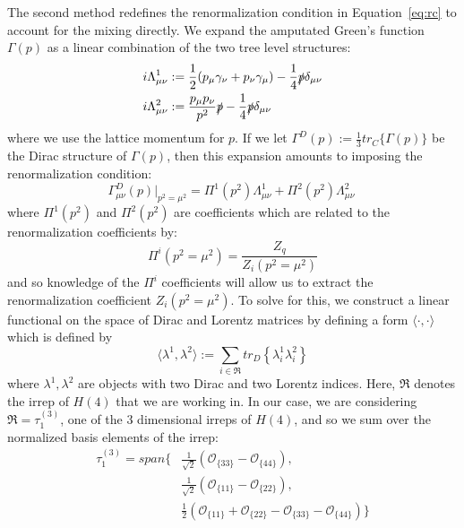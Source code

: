 \documentclass[11pt, oneside]{article}   	%
\theoremstyle{definition}
\begin{document}
The second method redefines the renormalization condition in Equation~\ref{eq:rc} to account for the mixing directly. We 
expand the amputated Green's function $\Gamma(p)$ as a linear combination of the two tree level structures:
\begin{align}
	i\Lambda_{\mu\nu}^{1} &:= \frac{1}{2}(p_\mu \gamma_\nu + p_\nu \gamma_\mu) - \frac{1}{4} \slashed p \delta_{\mu\nu} \\
	i\Lambda_{\mu\nu}^2 &:= \frac{p_\mu p_\nu}{p^2} \slashed p - \frac{1}{4} \slashed p \delta_{\mu\nu}
\end{align}
where we use the lattice momentum for $p$. If we let $\Gamma^D(p) := \frac{1}{3} tr_C\{\Gamma(p)\}$ be the Dirac structure of 
$\Gamma(p)$, then this expansion amounts to imposing the renormalization condition:
\begin{equation}
	\Gamma_{\mu\nu}^D(p)\bigg|_{p^2 = \mu^2} = \Pi^1(p^2) \Lambda^1_{\mu\nu} + \Pi^2(p^2) \Lambda^2_{\mu\nu}~
	\label{eq:mix_rc}
\end{equation}
where $\Pi^1(p^2)$ and $\Pi^2(p^2)$ are coefficients which are related to the renormalization coefficients by:
\begin{equation}
	\Pi^i(p^2 = \mu^2) = \frac{Z_q}{Z_i(p^2 = \mu^2)}
\end{equation}
and so knowledge of the $\Pi^i$ coefficients will allow us to extract the renormalization coefficient $Z_i(p^2 = \mu^2)$. To solve for 
this, we construct a linear functional on the space of Dirac and Lorentz matrices by defining a form $\langle\cdot, \cdot\rangle$ 
which is defined by
\begin{equation}
	\langle \lambda^1, \lambda^2\rangle := \sum_{i\in\mathfrak R} tr_D\left\{\lambda^1_i \lambda^2_i\right\}
\end{equation}
where $\lambda^1, \lambda^2$ are objects with two Dirac and two Lorentz indices. Here, $\mathfrak R$ denotes the irrep 
of $H(4)$ that we are working in. In our case, we are considering $\mathfrak R = \tau_1^{(3)}$, one of the 3 dimensional irreps 
of $H(4)$, and so we sum over the normalized basis elements of the irrep:
\begin{align}
	\tau_1^{(3)} = span\bigg\{ &\frac{1}{\sqrt{2}} \left(\mathcal O_{\{33\}} - \mathcal O_{\{44\}}\right), \\ 
	& \frac{1}{\sqrt{2}} \left(\mathcal O_{\{11\}} - \mathcal O_{\{22\}}\right), \\
	& \frac{1}{2} \left(\mathcal O_{\{11\}} + \mathcal O_{\{22\}} - \mathcal O_{\{33\}} - \mathcal O_{\{44\}}\right) \bigg\}
\end{align}
\end{document}
